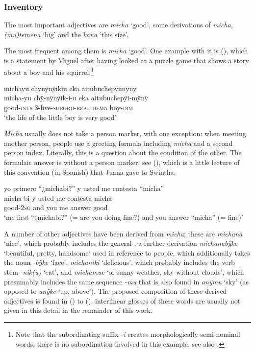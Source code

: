 \subsubsection{Inventory}\label{sec:ADJInventory}

The most important adjectives are \textit{micha} ‘good’, some derivations of \textit{micha}, \textit{(mu)temena} ‘big’ and the  \textit{kana} ‘this size’.

The most frequent among them is \textit{micha} ‘good’. One example with it is (), which is a statement by Miguel after having looked at a puzzle game that shows a story about a boy and his squirrel.\footnote{Note that the subordinating suffix \textit{-i} creates morphologically semi-nominal words, there is no subordination involved in this example, see also .}

\ea\label{ex:micha-1}
\begingl
\glpreamble michayu chÿnÿnÿikiu eka aitubuchepÿimÿnÿ\\
\gla micha-yu chÿ-nÿnÿik-i-u eka aitubuchepÿi-mÿnÿ\\
\glb good-\textsc{ints} 3-live-\textsc{subord}-\textsc{real} \textsc{dem}a boy-\textsc{dim}\\
\glft ‘the life of the little boy is very good’
\endgl
\trailingcitation{[mdx-c120416ls.191]}
\xe

\textit{Micha} usually does not take a person marker, with one exception: when meeting another person, people use a greeting formula including \textit{micha} and a second person index. Literally, this is a question about the condition of the other. The formulaic answer is without a person marker; see (), which is a little lecture of this convention (in Spanish) that Juana gave to Swintha.

\ea\label{ex:ADJ-micha-1}
\begingl
\glpreamble yo primero “¿michabi?” y usted me contesta “micha”\\
 micha-bi {y usted me contesta} micha\\
 good-2\textsc{sg} {and you me answer} good\\
\glft ‘me first “¿michabi?” (= are you doing fine?) and you answer “micha” (= fine)’
\endgl
\trailingcitation{[jxx-n101013s-1.080-083]}
\xe
{}

A number of other adjectives have been derived from \textit{micha}; these are \textit{michana} ‘nice’, which probably includes the general , a further derivation \textit{michanabÿke} ‘beautiful, pretty, handsome’ used in reference to people, which additionally takes the noun \textit{-bÿke} ‘face’, \textit{michaniki} ‘delicious’, which probably includes the verb stem \textit{-nik(u)} ‘eat’, and \textit{michamue} ‘of sunny weather, sky without clouds’, which presumably includes the same sequence \textit{-mu} that is also found in \textit{anÿmu} ‘sky’ (as opposed to \textit{anÿke} ‘up, above’). The proposed composition of these derived adjectives is found in () to (), interlinear glosses of these words are usually not given in this detail in the remainder of this work.

